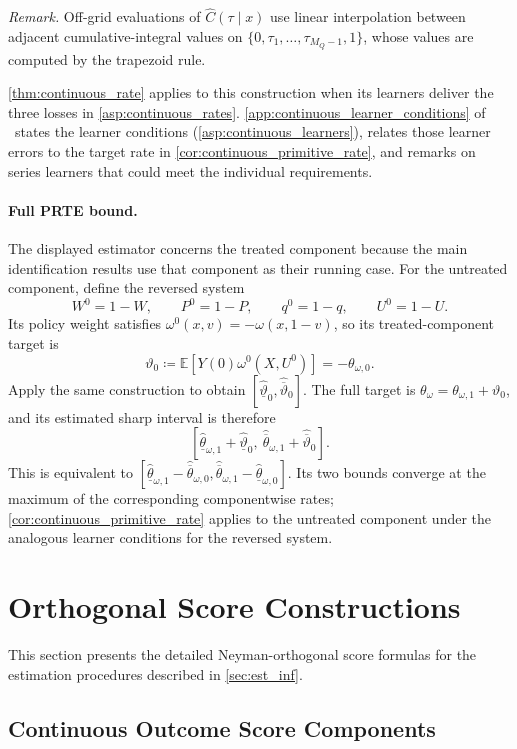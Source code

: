 \noindent\textit{Remark.} Off-grid evaluations of $\widehat C(\tau\mid x)$ use linear interpolation between adjacent cumulative-integral values on $\{0,\tau_1,\ldots,\tau_{M_Q-1},1\}$, whose values are computed by the trapezoid rule.


\cref{thm:continuous_rate} applies to this construction when its learners deliver the three losses in \cref{asp:continuous_rates}. \cref{app:continuous_learner_conditions} of \oalocation\ states the learner conditions (\cref{asp:continuous_learners}), relates those learner errors to the target rate in \cref{cor:continuous_primitive_rate}, and remarks on series learners that could meet the individual requirements.

\paragraph{Full PRTE bound.} The displayed estimator concerns the treated component because the main identification results use that component as their running case. For the untreated component, define the reversed system
\[
    W^0=1-W,\qquad P^0=1-P,\qquad q^0=1-q,\qquad U^0=1-U.
\]
Its policy weight satisfies $\omega^0(x,v)=-\omega(x,1-v)$, so its treated-component target is
\[
    \vartheta_0\coloneqq\mathbb E[Y(0)\omega^0(X,U^0)]
    =-\theta_{\omega,0}.
\]
Apply the same construction to obtain $[\hat{\underline\vartheta}_0,\hat{\overline\vartheta}_0]$. The full target is $\theta_\omega=\theta_{\omega,1}+\vartheta_0$, and its estimated sharp interval is therefore
\[
    [\hat{\underline\theta}_{\omega,1}+\hat{\underline\vartheta}_0,\ 
      \hat{\overline\theta}_{\omega,1}+\hat{\overline\vartheta}_0].
\]
This is equivalent to $[\hat{\underline\theta}_{\omega,1}-\hat{\overline\theta}_{\omega,0},\hat{\overline\theta}_{\omega,1}-\hat{\underline\theta}_{\omega,0}]$. Its two bounds converge at the maximum of the corresponding componentwise rates; \cref{cor:continuous_primitive_rate} applies to the untreated component under the analogous learner conditions for the reversed system.


\section{Orthogonal Score Constructions}\label{app:scores}

This section presents the detailed Neyman-orthogonal score formulas for the estimation procedures described in \cref{sec:est_inf}.

\subsection{Continuous Outcome Score Components}\label{app:scores_continuous}

